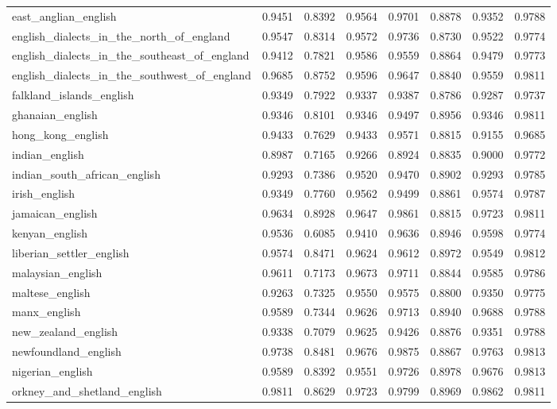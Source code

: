 \begin{landscape}
\begin{longtable}{lccccccc}
east\_anglian\_english & 0.9451 & 0.8392 & 0.9564 & 0.9701 & 0.8878 & 0.9352 & 0.9788 \\
english\_dialects\_in\_the\_north\_of\_england & 0.9547 & 0.8314 & 0.9572 & 0.9736 & 0.8730 & 0.9522 & 0.9774 \\
english\_dialects\_in\_the\_southeast\_of\_england & 0.9412 & 0.7821 & 0.9586 & 0.9559 & 0.8864 & 0.9479 & 0.9773 \\
english\_dialects\_in\_the\_southwest\_of\_england & 0.9685 & 0.8752 & 0.9596 & 0.9647 & 0.8840 & 0.9559 & 0.9811 \\
falkland\_islands\_english & 0.9349 & 0.7922 & 0.9337 & 0.9387 & 0.8786 & 0.9287 & 0.9737 \\
ghanaian\_english & 0.9346 & 0.8101 & 0.9346 & 0.9497 & 0.8956 & 0.9346 & 0.9811 \\
hong\_kong\_english & 0.9433 & 0.7629 & 0.9433 & 0.9571 & 0.8815 & 0.9155 & 0.9685 \\
indian\_english & 0.8987 & 0.7165 & 0.9266 & 0.8924 & 0.8835 & 0.9000 & 0.9772 \\
indian\_south\_african\_english & 0.9293 & 0.7386 & 0.9520 & 0.9470 & 0.8902 & 0.9293 & 0.9785 \\
irish\_english & 0.9349 & 0.7760 & 0.9562 & 0.9499 & 0.8861 & 0.9574 & 0.9787 \\
jamaican\_english & 0.9634 & 0.8928 & 0.9647 & 0.9861 & 0.8815 & 0.9723 & 0.9811 \\
kenyan\_english & 0.9536 & 0.6085 & 0.9410 & 0.9636 & 0.8946 & 0.9598 & 0.9774 \\
liberian\_settler\_english & 0.9574 & 0.8471 & 0.9624 & 0.9612 & 0.8972 & 0.9549 & 0.9812 \\
malaysian\_english & 0.9611 & 0.7173 & 0.9673 & 0.9711 & 0.8844 & 0.9585 & 0.9786 \\
maltese\_english & 0.9263 & 0.7325 & 0.9550 & 0.9575 & 0.8800 & 0.9350 & 0.9775 \\
manx\_english & 0.9589 & 0.7344 & 0.9626 & 0.9713 & 0.8940 & 0.9688 & 0.9788 \\
new\_zealand\_english & 0.9338 & 0.7079 & 0.9625 & 0.9426 & 0.8876 & 0.9351 & 0.9788 \\
newfoundland\_english & 0.9738 & 0.8481 & 0.9676 & 0.9875 & 0.8867 & 0.9763 & 0.9813 \\
nigerian\_english & 0.9589 & 0.8392 & 0.9551 & 0.9726 & 0.8978 & 0.9676 & 0.9813 \\
orkney\_and\_shetland\_english & 0.9811 & 0.8629 & 0.9723 & 0.9799 & 0.8969 & 0.9862 & 0.9811 \\

\end{longtable}
\end{landscape}
